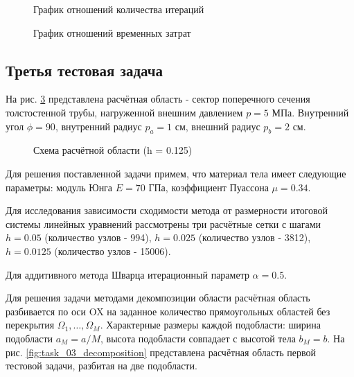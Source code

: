 \documentclass[a4paper, 14pt]{extarticle}
\newcommand{\area}{rectangle}
\newcommand{\task}{3_fixes}
\newcommand{\taskNum}{01}
\begin{document}
\newpage

\begin{figure}[H]
\caption{График отношений количества итераций}
\label{fig:task_\taskNum_iters_cg}
\end{figure}
\begin{figure}[H]
\caption{График отношений временных затрат}
\label{fig:task_\taskNum_time_cg}
\end{figure}

\newpage

\subsection{Третья тестовая задача}

\renewcommand{\area}{thick_walled_cylinder}
\renewcommand{\task}{pressure_only}
\renewcommand{\taskNum}{03}

На рис. \ref{fig:task_\taskNum_scheme} представлена расчётная область - сектор поперечного сечения толстостенной трубы, нагруженной внешним давлением $p = 5$ МПа. Внутренний угол $\phi = 90$, внутренний радиус $p_a = 1$ см, внешний радиус $p_b = 2 $ см.

\begin{figure}[h]
\caption{Схема расчётной области (h = 0.125)}
\label{fig:task_\taskNum_scheme}
\end{figure}

Для решения поставленной задачи примем, что материал тела имеет следующие параметры: модуль Юнга $E = 70$ ГПа, коэффициент Пуассона $\mu = 0.34$. 

Для исследования зависимости сходимости метода от размерности итоговой системы линейных уравнений рассмотрены три расчётные сетки с шагами $h = 0.05$ (количество узлов - 994), $h = 0.025$ (количество узлов - 3812), $h = 0.0125$ (количество узлов - 15006).

Для аддитивного метода Шварца итерационный параметр $\alpha = 0.5$.

\newpage

Для решения задачи методами декомпозиции области расчётная область разбивается по оси OX на заданное количество прямоугольных областей без перекрытия $\Omega_1, \ldots, \Omega_M$. Характерные размеры каждой подобласти: ширина подобласти $a_M = a / M$, высота подобласти совпадает с высотой тела $b_M = b$. На рис. \ref{fig:task_\taskNum_decomposition} представлена расчётная область первой тестовой задачи, разбитая на две подобласти.
\end{document}

